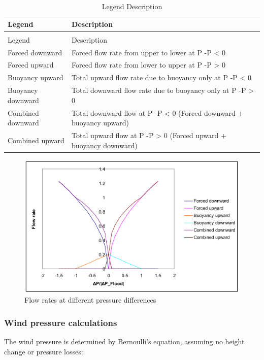 \begin{longtable}[c]{p{1.5in}p{4.5in}}
\caption{Legend Description \label{table:legend-description}} \tabularnewline
\toprule 
Legend & Description \tabularnewline
\midrule
\endfirsthead

\caption[]{Legend Description} \tabularnewline
\toprule 
Legend & Description \tabularnewline
\midrule
\endhead

Forced downward & Forced flow rate from upper to lower at P  -P    <  0 \tabularnewline
Forced upward & Forced flow rate from lower to upper at P  -P    >  0 \tabularnewline
Buoyancy upward & Total upward flow rate due to buoyancy only at P  -P    <  0 \tabularnewline
Buoyancy downward & Total downward flow rate due to buoyancy only at P  -P    >  0 \tabularnewline
Combined downward & Total downward flow at P  -P    <  0 (Forced downward + buoyancy upward) \tabularnewline
Combined upward & Total upward flow at P  -P    >  0 (Forced upward + buoyancy downward) \tabularnewline
\bottomrule
\end{longtable}

\begin{figure}[hbtp] %
\centering
\includegraphics[width=0.9\linewidth, height=0.9\textheight, keepaspectratio=true]{media/image2743.svg.png}
\caption{Flow rates at different pressure differences \protect \label{fig:flow-rates-at-different-pressure-differences}}
\end{figure}

\subsubsection{Wind pressure calculations}\label{wind-pressure-calculations}

The wind pressure is determined by Bernoulli's equation, assuming no height change or pressure losses:

